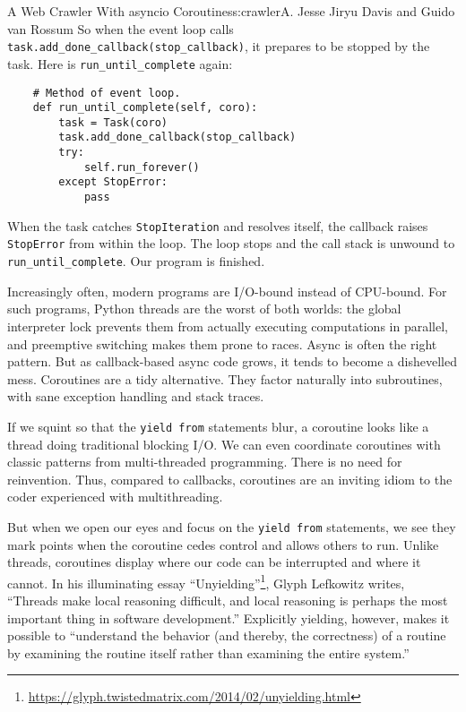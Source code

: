 \begin{aosachapter}{A Web Crawler With asyncio Coroutines}{s:crawler}{A. Jesse Jiryu Davis and Guido van Rossum}
So when the event loop calls
\texttt{task.add\_done\_callback(stop\_callback)}, it prepares to be
stopped by the task. Here is \texttt{run\_until\_complete} again:

\begin{verbatim}
    # Method of event loop.
    def run_until_complete(self, coro):
        task = Task(coro)
        task.add_done_callback(stop_callback)
        try:
            self.run_forever()
        except StopError:
            pass
\end{verbatim}

When the task catches \texttt{StopIteration} and resolves itself, the
callback raises \texttt{StopError} from within the loop. The loop stops
and the call stack is unwound to \texttt{run\_until\_complete}. Our
program is finished.

\label{conclusion}

Increasingly often, modern programs are I/O-bound instead of CPU-bound.
For such programs, Python threads are the worst of both worlds: the
global interpreter lock prevents them from actually executing
computations in parallel, and preemptive switching makes them prone to
races. Async is often the right pattern. But as callback-based async
code grows, it tends to become a dishevelled mess. Coroutines are a tidy
alternative. They factor naturally into subroutines, with sane exception
handling and stack traces.

If we squint so that the \texttt{yield from} statements blur, a
coroutine looks like a thread doing traditional blocking I/O. We can
even coordinate coroutines with classic patterns from multi-threaded
programming. There is no need for reinvention. Thus, compared to
callbacks, coroutines are an inviting idiom to the coder experienced
with multithreading.

But when we open our eyes and focus on the \texttt{yield from}
statements, we see they mark points when the coroutine cedes control and
allows others to run. Unlike threads, coroutines display where our code
can be interrupted and where it cannot. In his illuminating essay
``Unyielding''\footnote{\url{https://glyph.twistedmatrix.com/2014/02/unyielding.html}},
Glyph Lefkowitz writes, ``Threads make local reasoning difficult, and
local reasoning is perhaps the most important thing in software
development.'' Explicitly yielding, however, makes it possible to
``understand the behavior (and thereby, the correctness) of a routine by
examining the routine itself rather than examining the entire system.''


\end{aosachapter}
